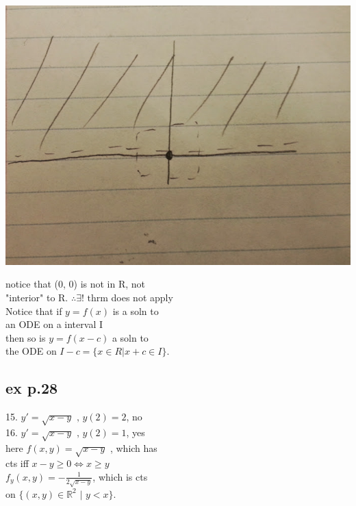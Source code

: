 \documentclass[10pt,a4paper]{article}
\begin{document}
  \includegraphics[scale=.45]{pic3}

  notice that (0, 0) is not in R, not \\
  "interior" to R. \( \therefore \exists \text{! thrm}\) does not apply
  \\
  Notice that if \( y = f(x) \) is a soln to \\
  an ODE on a interval I  \\
  then so is \( y = f(x-c)\) a soln to  \\
  the ODE on \( I - c =\{ x \in R | x + c \in I\}\).  \\

  \newpage 
\subsection*{ ex p.28 }
15. \( y' = \sqrt{x-y} \text{ ,  } y(2) = 2 \),  no \\
16. \( y' = \sqrt{x-y} \text{ ,  } y(2) = 1 \),  yes \\
here \( f(x, y) = \sqrt{x-y}\) , which has \\
cts iff  \( x-y \geq 0 \iff x \geq y\) \\ 
\( f_y(x, y) = - \frac{1}{2\sqrt{x-y}}\),  which is cts \\
on \( \{ (x,y) \in \mathbb{R}^2 \text{ | } y<x \}\). \\
\end{document}
